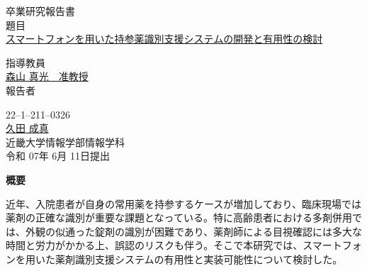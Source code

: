 \documentclass[12pt]{article}
\begin{document}
\pagestyle{empty}

\begin{center}
\vspace*{1cm}
\large
{\LARGE 卒業研究報告書}\\
\vspace*{0.8cm}
題目\\
\vspace*{1cm}
{\Huge \underline{スマートフォンを用いた持参薬識別支援システムの開発と有用性の検討}}\\
\vspace{3mm}

\vspace*{3cm}
指導教員\\
\vspace*{0.3cm}
\underline{\LARGE 森山 真光　准教授}\\
\vspace*{3cm}
報告者\\
\vspace*{0.3cm}

{22--1--211--0326}\\
\vspace*{0.3cm}
\underline{\Huge 久田 成真}\\
\vspace*{0.5cm}
近畿大学情報学部情報学科\\
\vspace*{2cm}
令和 07年 6月 11日提出\\
\end{center}

\newpage
\normalsize


\clearpage
\begin{center}
{\bf \Large 概要}
\end{center} 

近年、入院患者が自身の常用薬を持参するケースが増加しており、臨床現場では薬剤の正確な識別が重要な課題となっている。特に高齢患者における多剤併用では、外観の似通った錠剤の識別が困難であり、薬剤師による目視確認には多大な時間と労力がかかる上、誤認のリスクも伴う。そこで本研究では、スマートフォンを用いた薬剤識別支援システムの有用性と実装可能性について検討した。
\end{document}
